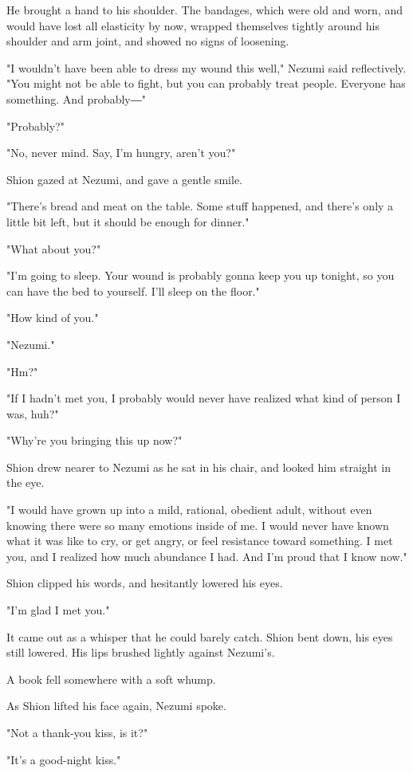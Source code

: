 He brought a hand to his shoulder. The bandages, which were old and
worn, and would have lost all elasticity by now, wrapped themselves
tightly around his shoulder and arm joint, and showed no signs of
loosening.

"I wouldn't have been able to dress my wound this well," Nezumi said
reflectively. "You might not be able to fight, but you can probably
treat people. Everyone has something. And probably―"

"Probably?"

"No, never mind. Say, I'm hungry, aren't you?"

Shion gazed at Nezumi, and gave a gentle smile.

"There's bread and meat on the table. Some stuff happened, and there's
only a little bit left, but it should be enough for dinner."

"What about you?"

"I'm going to sleep. Your wound is probably gonna keep you up tonight,
so you can have the bed to yourself. I'll sleep on the floor."

"How kind of you."

"Nezumi."

"Hm?"

"If I hadn't met you, I probably would never have realized what kind of
person I was, huh?"

"Why're you bringing this up now?"

Shion drew nearer to Nezumi as he sat in his chair, and looked him
straight in the eye.

"I would have grown up into a mild, rational, obedient adult, without
even knowing there were so many emotions inside of me. I would never
have known what it was like to cry, or get angry, or feel resistance
toward something. I met you, and I realized how much abundance I had.
And I'm proud that I know now."

Shion clipped his words, and hesitantly lowered his eyes.

"I'm glad I met you."

It came out as a whisper that he could barely catch. Shion bent down,
his eyes still lowered. His lips brushed lightly against Nezumi's.

A book fell somewhere with a soft whump.

As Shion lifted his face again, Nezumi spoke.

"Not a thank-you kiss, is it?"

"It's a good-night kiss."

